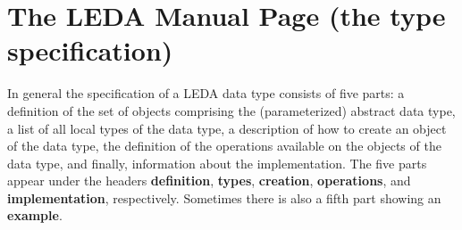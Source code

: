 \section{The LEDA Manual Page (the type specification)} 
\label{LEDA Manual Page}

\label{Specifications}
In general the specification of a LEDA data type consists of five parts: a
definition of the set of objects comprising the (parameterized) abstract data
type, a list of all local types of the data type, a description of how to create an object of the data type, the definition
of the operations available on the objects of the data type, and finally,
information about the implementation. The five parts appear under the headers
\textbf{definition}, \textbf{types}, \textbf{creation}, \textbf{operations}, and 
\textbf{implementation}, respectively.  Sometimes there is also a fifth part 
showing an \textbf{example}.

